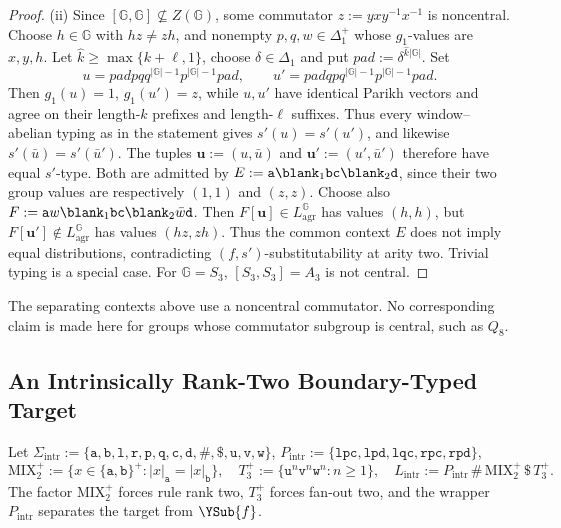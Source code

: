 \begin{proof}
(ii) Since $[{\mathbb G},{\mathbb G}]\not\subseteq Z({\mathbb G})$, some commutator
$z:=yx y^{-1}x^{-1}$ is noncentral.  Choose $h\in {\mathbb G}$ with $hz\ne zh$,
and nonempty $p,q,w\in\Delta_1^+$ whose $g_1$-values are $x,y,h$.
Let $\hat k\ge\max\{k+\ell,1\}$, choose
$\delta\in\Delta_1$ and put $\mathit{pad}:=\delta^{\hat k|{\mathbb G}|}$.
Set
\[
 u=\mathit{pad} p q q^{|{\mathbb G}|-1}p^{|{\mathbb G}|-1}\mathit{pad},\qquad
 u'=\mathit{pad} q p q^{|{\mathbb G}|-1}p^{|{\mathbb G}|-1}\mathit{pad}.
\]
Then $g_1(u)=1$, $g_1(u')=z$, while $u,u'$ have identical Parikh
vectors and agree on their length-$k$ prefixes and length-$\ell$
suffixes.  Thus every window--abelian typing as in the statement
gives $s'(u)=s'(u')$, and likewise $s'(\bar u)=s'(\bar u')$.
The tuples $\mathbf u:=(u,\bar u)$ and $\mathbf u':=(u',\bar u')$ therefore have equal
$s'$-type.  Both are admitted by
$E:=\mathtt a\blank_1\mathtt{bc}\blank_2\mathtt d$,
since their two group values are respectively $(1,1)$ and $(z,z)$.
Choose also
$F:=\mathtt a w\blank_1\mathtt{bc}\blank_2\bar w\mathtt d$.
Then $F[\mathbf u]\in L_{\mathrm{agr}}^{\mathbb G}$ has values $(h,h)$, but
$F[\mathbf u']\notin L_{\mathrm{agr}}^{\mathbb G}$ has values $(hz,zh)$.
Thus the common context $E$ does not imply equal distributions,
contradicting $(f,s')$-substitutability at arity two.  Trivial typing
is a special case.  For ${\mathbb G}=S_3$, $[S_3,S_3]=A_3$ is not central.
\end{proof}

\begin{remark}
The separating contexts above use a noncentral commutator.
No corresponding claim is made here for groups whose commutator
subgroup is central, such as $Q_8$.
\end{remark}

\subsection{An Intrinsically Rank-Two Boundary-Typed Target}
\label{subsec:intrinsic-ranktwo}

Let $\Sigma_{\mathrm{intr}}:=\{\mathtt a,\mathtt b,\mathtt l,\mathtt r,\mathtt p,\mathtt q,
\mathtt c,\mathtt d,\mathtt\#,\mathtt\$,\mathtt u,\mathtt v,\mathtt w\}$,
$P_{\mathrm{intr}}:=\{\mathtt{lpc},\mathtt{lpd},\mathtt{lqc},\mathtt{rpc},\mathtt{rpd}\}$,
\[
 \mathrm{MIX}_2^+:=\{x\in\{\mathtt a,\mathtt b\}^+:|x|_{\mathtt a}=|x|_{\mathtt b}\},\quad
 T_3^+:=\{\mathtt u^n\mathtt v^n\mathtt w^n:n\ge1\},\quad
 L_{\mathrm{intr}}:=P_{\mathrm{intr}}\,\mathtt\#\,\mathrm{MIX}_2^+\,\mathtt\$\,T_3^+ .
\]
The factor $\mathrm{MIX}_2^+$ forces rule rank two, $T_3^+$ forces fan-out two, and the
wrapper $P_{\mathrm{intr}}$ separates the target from $\YSub{f}$.


